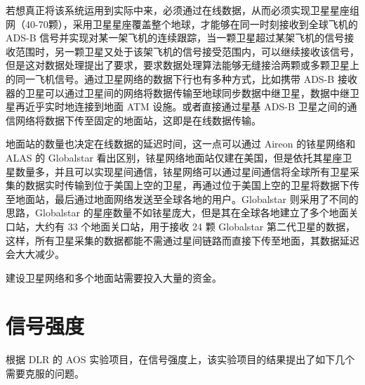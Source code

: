 
若想真正将该系统运用到实际中来，必须通过在线数据，从而必须实现卫星星座组网（40-70颗），采用卫星星座覆盖整个地球，才能够在同一时刻接收到全球飞机的 ADS-B 信号并实现对某一架飞机的连续跟踪，当一颗卫星超过某架飞机的信号接收范围时，另一颗卫星又处于该架飞机的信号接受范围内，可以继续接收该信号，但是这对数据处理提出了要求，要求数据处理算法能够无缝接洽两颗或多颗卫星上的同一飞机信号。通过卫星网络的数据下行也有多种方式，比如携带 ADS-B 接收器的卫星可以通过卫星间的网络将数据传输至地球同步数据中继卫星，数据中继卫星再近乎实时地连接到地面 ATM 设施。或者直接通过星基 ADS-B 卫星之间的通信网络将数据下传至固定的地面站，这即是在线数据传输。

地面站的数量也决定在线数据的延迟时间，这一点可以通过 Aireon 的铱星网络和 ALAS 的 Globalstar 看出区别，铱星网络地面站仅建在美国，但是依托其星座卫星数量多，并且可以实现星间通信，铱星网络可以通过星间通信将全球所有卫星采集的数据实时传输到位于美国上空的卫星，再通过位于美国上空的卫星将数据下传至地面站，最后通过地面网络发送至全球各地的用户。Globalstar 则采用了不同的思路，Globalstar 的星座数量不如铱星庞大，但是其在全球各地建立了多个地面关口站，大约有 33 个地面关口站，用于接收 24 颗 Globalstar 第二代卫星的数据，这样，所有卫星采集的数据都能不需通过星间链路而直接下传至地面，其数据延迟会大大减少。

建设卫星网络和多个地面站需要投入大量的资金。

\section{信号强度}

根据 DLR 的 AOS 实验项目，在信号强度上，该实验项目的结果提出了如下几个需要克服的问题。

